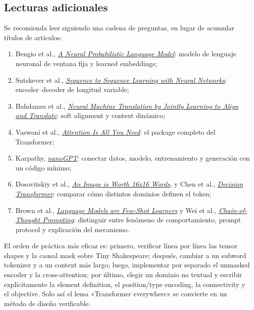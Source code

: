 \subsection{Lecturas adicionales}

Se recomienda leer siguiendo una cadena de preguntas, en lugar de acumular títulos de artículos:

\begin{enumerate}
  \item Bengio et al., \href{https://www.jmlr.org/papers/v3/bengio03a.html}{\emph{A Neural Probabilistic Language Model}}: modelo de lenguaje neuronal de ventana fija y learned embeddings;
  \item Sutskever et al., \href{https://proceedings.neurips.cc/paper/2014/hash/a14ac55a4f27472c5d894ec1c3c743d2-Abstract.html}{\emph{Sequence to Sequence Learning with Neural Networks}}: encoder--decoder de longitud variable;
  \item Bahdanau et al., \href{https://arxiv.org/abs/1409.0473}{\emph{Neural Machine Translation by Jointly Learning to Align and Translate}}: soft alignment y context dinámico;
  \item Vaswani et al., \href{https://arxiv.org/abs/1706.03762}{\emph{Attention Is All You Need}}: el package completo del Transformer;
  \item Karpathy, \href{https://github.com/karpathy/nanoGPT}{\emph{nanoGPT}}: conectar datos, modelo, entrenamiento y generación con un código mínimo;
  \item Dosovitskiy et al., \href{https://arxiv.org/abs/2010.11929}{\emph{An Image is Worth 16x16 Words}}, y Chen et al., \href{https://arxiv.org/abs/2106.01345}{\emph{Decision Transformer}}: comparar cómo distintos dominios definen el token;
  \item Brown et al., \href{https://arxiv.org/abs/2005.14165}{\emph{Language Models are Few-Shot Learners}} y Wei et al., \href{https://arxiv.org/abs/2201.11903}{\emph{Chain-of-Thought Prompting}}: distinguir entre fenómeno de comportamiento, prompt protocol y explicación del mecanismo.
\end{enumerate}

El orden de práctica más eficaz es: primero, verificar línea por línea las tensor shapes y la causal mask sobre Tiny Shakespeare; después, cambiar a un subword tokenizer y a un context más largo; luego, implementar por separado el unmasked encoder y la cross-attention; por último, elegir un dominio no textual y escribir explícitamente la element definition, el position/type encoding, la connectivity y el objective. Solo así el lema «Transformer everywhere» se convierte en un método de diseño verificable.


